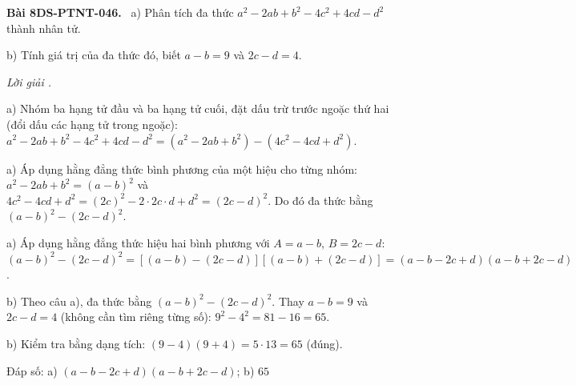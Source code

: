 \documentclass[12pt,a4paper]{article}
\newenvironment{problem}[1][]{\par\medskip\noindent\textbf{Bài #1.}\ }{\par}
\newenvironment{solution}[1][]{\par\noindent\textit{Lời giải #1.}\par}{\par}
\begin{document}
\begin{problem}[8DS-PTNT-046]
a) Phân tích đa thức $a^2 - 2ab + b^2 - 4c^2 + 4cd - d^2$ thành nhân tử.

b) Tính giá trị của đa thức đó, biết $a - b = 9$ và $2c - d = 4$.

\begin{solution}
a) Nhóm ba hạng tử đầu và ba hạng tử cuối, đặt dấu trừ trước ngoặc thứ hai (đổi dấu các hạng tử trong ngoặc): $a^2 - 2ab + b^2 - 4c^2 + 4cd - d^2 = (a^2 - 2ab + b^2) - (4c^2 - 4cd + d^2)$.

a) Áp dụng hằng đẳng thức bình phương của một hiệu cho từng nhóm: $a^2 - 2ab + b^2 = (a - b)^2$ và $4c^2 - 4cd + d^2 = (2c)^2 - 2 \cdot 2c \cdot d + d^2 = (2c - d)^2$. Do đó đa thức bằng $(a - b)^2 - (2c - d)^2$.

a) Áp dụng hằng đẳng thức hiệu hai bình phương với $A = a - b$, $B = 2c - d$: $(a - b)^2 - (2c - d)^2 = \left[(a - b) - (2c - d)\right]\left[(a - b) + (2c - d)\right] = (a - b - 2c + d)(a - b + 2c - d)$.

b) Theo câu a), đa thức bằng $(a - b)^2 - (2c - d)^2$. Thay $a - b = 9$ và $2c - d = 4$ (không cần tìm riêng từng số): $9^2 - 4^2 = 81 - 16 = 65$.

b) Kiểm tra bằng dạng tích: $(9 - 4)(9 + 4) = 5 \cdot 13 = 65$ (đúng).

Đáp số: a) $\boxed{(a - b - 2c + d)(a - b + 2c - d)}$; b) $\boxed{65}$
\end{solution}
\end{problem}
\end{document}
